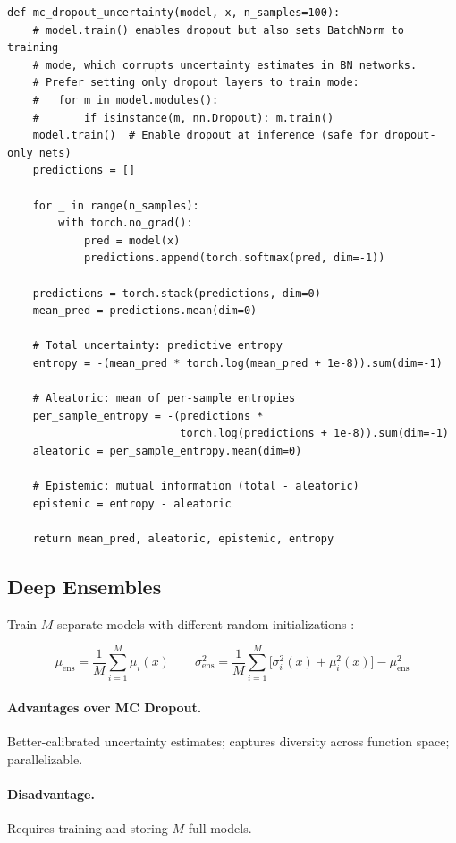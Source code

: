 \begin{lstlisting}[style=python, caption={MC Dropout uncertainty estimation}]
def mc_dropout_uncertainty(model, x, n_samples=100):
    # model.train() enables dropout but also sets BatchNorm to training
    # mode, which corrupts uncertainty estimates in BN networks.
    # Prefer setting only dropout layers to train mode:
    #   for m in model.modules():
    #       if isinstance(m, nn.Dropout): m.train()
    model.train()  # Enable dropout at inference (safe for dropout-only nets)
    predictions = []

    for _ in range(n_samples):
        with torch.no_grad():
            pred = model(x)
            predictions.append(torch.softmax(pred, dim=-1))

    predictions = torch.stack(predictions, dim=0)
    mean_pred = predictions.mean(dim=0)

    # Total uncertainty: predictive entropy
    entropy = -(mean_pred * torch.log(mean_pred + 1e-8)).sum(dim=-1)

    # Aleatoric: mean of per-sample entropies
    per_sample_entropy = -(predictions *
                           torch.log(predictions + 1e-8)).sum(dim=-1)
    aleatoric = per_sample_entropy.mean(dim=0)

    # Epistemic: mutual information (total - aleatoric)
    epistemic = entropy - aleatoric

    return mean_pred, aleatoric, epistemic, entropy
\end{lstlisting}

\subsection{Deep Ensembles}

Train $M$ separate models with different random initializations \autocite{lakshminarayanan2017simple}:

\[
\mu_{\text{ens}} = \frac{1}{M}\sum_{i=1}^{M} \mu_i(x)
\qquad
\sigma^2_{\text{ens}} = \frac{1}{M}\sum_{i=1}^{M}\bigl[\sigma^2_i(x) + \mu^2_i(x)\bigr] - \mu^2_{\text{ens}}
\]

\paragraph{Advantages over MC Dropout.} Better-calibrated uncertainty estimates; captures diversity across function space; parallelizable. \paragraph{Disadvantage.} Requires training and storing $M$ full models.

